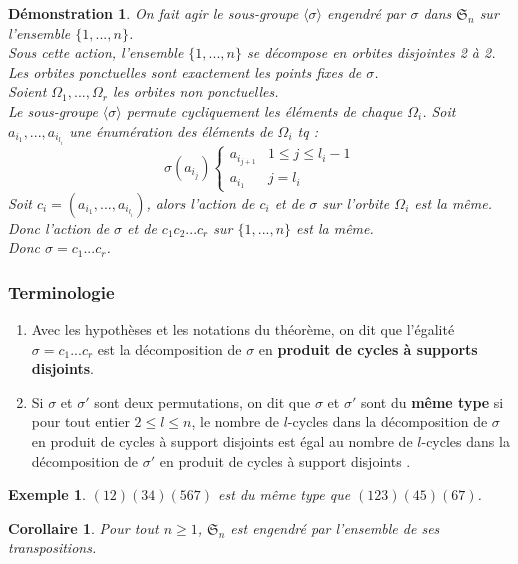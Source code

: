 \documentclass[a4paper, oneside]{report}
\theoremstyle{break}
\newtheorem{cor}[thm]{Corollaire}
\newtheorem{exem}[thm]{Exemple}
\newtheorem*{demo}{Démonstration}
\newcommand{\pcsd}{produit de cycles à support disjoints }
\renewcommand{\S}{\mathfrak{S}}
\begin{document}
\begin{demo}
	On fait agir le sous-groupe $\langle \sigma\rangle$ engendré par $\sigma$ dans $\S_n$ sur l'ensemble $\{1,...,n\}$.\\
	Sous cette action, l'ensemble $\{1,...,n\}$ se décompose en orbites disjointes 2 à 2. Les orbites ponctuelles sont exactement les points fixes de $\sigma$.\\
	Soient $\Omega_1,...,\Omega_r$ les orbites non ponctuelles.\\
	Le sous-groupe $\langle \sigma\rangle$ permute cycliquement les éléments de chaque $\Omega_i$. Soit $a_{i_1},...,a_{i_{l_i}}$ une énumération des éléments de $\Omega_i$ tq :
	$$\sigma(a_{i_j})\left\{\begin{array}{ll}
	a_{i_{j+1}}&1\leq j \leq l_i-1\\
	a_{i_1}&j=l_i
	\end{array}\right. $$
	Soit $c_i=(a_{i_1},...,a_{i_{l_i}})$, alors l'action de $c_i$ et de $\sigma$ sur l'orbite $\Omega_i$ est la même.\\
	Donc l'action de $\sigma$ et de $c_1c_2...c_r$ sur $\{1,...,n\}$ est la même.\\
	Donc $\sigma=c_1...c_r$.
\end{demo}

\subsubsection{Terminologie}
\begin{enumerate}
\item Avec les hypothèses et les notations du théorème, on dit que l'égalité $\sigma=c_1...c_r$ est la décomposition de $\sigma$ en \textbf{produit de cycles à supports disjoints}.

\item Si $\sigma$ et $\sigma '$ sont deux permutations, on dit que $\sigma$ et $\sigma '$ sont du \textbf{même type} si pour tout entier $2\leq l \leq n$, le nombre de $l$-cycles dans la décomposition de $\sigma$ en produit de cycles à support disjoints est égal au nombre de $l$-cycles dans la décomposition de $\sigma '$ en \pcsd.
\end{enumerate}

\begin{exem}
	$(12)(34)(567)$ est du même type que $(123)(45)(67)$.
\end{exem}

\begin{cor}
	Pour tout $n\geq 1$, $\S_n$ est engendré par l'ensemble de ses transpositions.
\end{cor}
\end{document}
